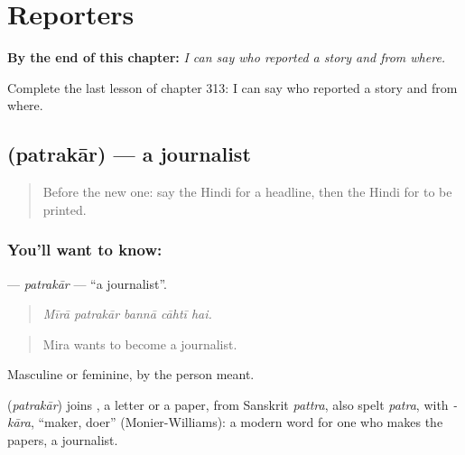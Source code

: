 
\chapter{Reporters}
\label{ch:hi-reporters}

\begin{chapteropening}
\textbf{By the end of this chapter:} \emph{I can say who reported a story and from where.}

Complete the last lesson of chapter 313: I can say who reported a story and from where.
\end{chapteropening}

\section[\texorpdfstring{\hi{पत्रकार} (patrakār)}{पत्रकार (patrakār)}]{ (patrakār) — a journalist}

\label{lesson:HI-C313-patrakar}



\begin{quote}
Before the new one: say the Hindi for a headline, then the Hindi for to be printed.
\end{quote}

\subsection*{You'll want to know: }
\textbf{} — \emph{patrakār} — \textquotedblleft{}a journalist\textquotedblright{}.

\begin{quote}
    
\end{quote}

\begin{quote}
\emph{Mīrā patrakār bannā cāhtī hai.}
\end{quote}

\begin{quote}
Mira wants to become a journalist.
\end{quote}

Masculine or feminine, by the person meant.

\begin{cousinweb}
\textbf{} (\emph{patrakār}) joins \textbf{}, a letter or a paper, from Sanskrit \emph{pattra}, also spelt \emph{patra}, with \emph{-kāra}, \textquotedblleft{}maker, doer\textquotedblright{} (Monier-Williams): a modern word for one who makes the papers, a journalist.
\end{cousinweb}

